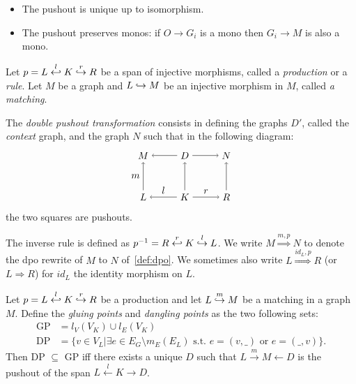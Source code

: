 \begin{property}
  \begin{itemize}
  \item The pushout is unique up to isomorphism.
  \item The pushout preserves monos: if $O\to G_i$ is a mono then $G_i\to M$ is also a mono.
  \end{itemize}
\end{property}

\begin{definition}
\label{def:dpo}
  Let $p = L\overset{l}{\hookleftarrow} K \overset{r}{\hookrightarrow} R$ be a span of injective morphisms, called a \emph{production} or a \emph{rule}. Let $M$ be a graph and $L\hookrightarrow M$ be an injective morphism in $M$, called \emph{a matching}.

  The \emph{double pushout transformation} consists in defining the graphs $D'$, called the \emph{context} graph, and the graph $N$ such that in the following diagram:
  \[
  \begin{tikzpicture} %
    \node (l) at (-1.5,0) {\(L\)};
    \node (d) at (0,0) {\(K\)};
    \node (r) at (1.5,0) {\(R\)};
    \node (m) at (-1.5,1.5) {\(M\)};
    \node (d') at (0,1.5) {\(D\)};
    \node (n) at (1.5,1.5) {\(N\)};
    \draw [->] (d) -- node [above,midway] {\(l\)} (l);
    \draw [->] (d) -- node [above,midway] {\(r\)} (r);
    \draw [->] (d') -- (m);
    \draw [->] (d') -- (n);
    \draw [->] (l) -- node [left,midway] {\(m\)}  (m);
    \draw [->] (d) -- (d');
    \draw [->] (r) -- (n);
  \end{tikzpicture}
  \]
  the two squares are pushouts.
\end{definition}

  The inverse rule is defined as $p^{-1} = R\overset{r}{\hookleftarrow} K \overset{l}{\hookrightarrow} L$.
  We write $M\overset{m,p}{\Rightarrow}N$ to denote the dpo rewrite of $M$ to $N$ of~\autoref{def:dpo}.
  We sometimes also write $L\overset{\mathit{id}_L,p}{\Rightarrow}R$ (or $L{\Rightarrow}R$) for
  $\mathit{id}_L$ the identity morphism on $L$.


\begin{property}
  Let $p = L\overset{l}{\hookleftarrow} K \overset{r}{\hookrightarrow} R$ be a production and let $L\overset{m}{\hookrightarrow} M$ be a matching in a graph $M$.
  Define the \emph{gluing points} and \emph{dangling points} as the two following sets:
  \begin{align*}
  \text{GP} &= l_V(V_K)\cup l_E(V_K)\\
  \text{DP} &= \{ v\in V_L \big| \exists e\in E_G\setminus m_E(E_L)\text{ s.t. }e=(v,\_)\text{ or }e=(\_, v)\}.
  \end{align*}
  Then DP $\subseteq$ GP iff there exists a unique $D$ such that $L\overset{m}{\rightarrow} M{\leftarrow} D$ is the pushout of the span $ L\overset{l}{\leftarrow} K {\rightarrow} D$.
\end{property}

